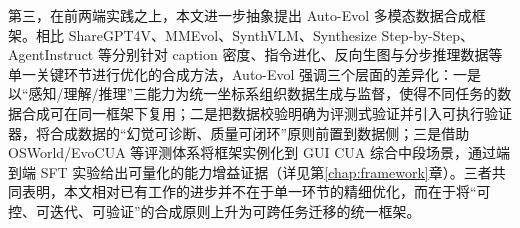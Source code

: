 第三，在前两端实践之上，本文进一步抽象提出 Auto-Evol 多模态数据合成框架。相比 ShareGPT4V、MMEvol、SynthVLM、Synthesize Step-by-Step、AgentInstruct 等分别针对 caption 密度、指令进化、反向生图与分步推理数据等单一关键环节进行优化的合成方法，Auto-Evol 强调三个层面的差异化：一是以“感知/理解/推理”三能力为统一坐标系组织数据生成与监督，使得不同任务的数据合成可在同一框架下复用；二是把数据校验明确为评测式验证并引入可执行验证器，将合成数据的“幻觉可诊断、质量可闭环”原则前置到数据侧；三是借助 OSWorld/EvoCUA 等评测体系将框架实例化到 GUI CUA 综合中段场景，通过端到端 SFT 实验给出可量化的能力增益证据（详见第\ref{chap:framework}章）。三者共同表明，本文相对已有工作的进步并不在于单一环节的精细优化，而在于将“可控、可迭代、可验证”的合成原则上升为可跨任务迁移的统一框架。
